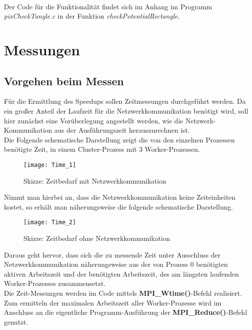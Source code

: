 \documentclass[
10pt, %
a4paper, %
oneside, %
headinclude,footinclude, %
BCOR5mm, %
]{scrartcl}
\begin{document}
\begin{algorithm}[H]
{{		}
	}
\end{algorithm}\

Der Code für die Funktionalität findet sich im Anhang im Programm \textit{pixCheckTangle.c} in der Funktion \textit{checkPotentialRectangle}.


\section{Messungen}
\subsection{Vorgehen beim Messen}

Für die Ermittlung des Speedups sollen Zeitmessungen durchgeführt werden. Da ein großer Anteil der Laufzeit für die Netzwerkkommunikation benötigt wird, soll hier zunächst eine Vorüberlegung angestellt werden, wie die Netzwerk-Kommunikation aus der Ausführungszeit herauszurechnen ist. \\Die Folgende schematische Darstellung zeigt die von den einzelnen Prozessen benötigte Zeit, in einem Cluster-Prozess mit 3 Worker-Prozessen.

\begin{figure}[h]
	\centering 
	\texttt{[image: Time\_1]} 
	\caption[Skizze: Zeitbedarf mit Netzwerkkommunikation]{Skizze: Zeitbedarf mit Netzwerkkommunikation }
	
\end{figure}

Nimmt man hierbei an, dass die Netzwerkkommunikation keine Zeiteinheiten kostet, so erhält man näherungsweise die folgende schematische Darstellung.

\begin{figure}[h]
	\centering 
	\texttt{[image: Time\_2]} 
	\caption[Skizze: Zeitbedarf ohne Netzwerkkommunikation]{Skizze: Zeitbedarf ohne Netzwerkkommunikation}
	
\end{figure}

Daraus geht hervor, dass sich die zu messende Zeit unter Ausschluss der Netzwerkkommunikation näherungsweise aus der von Prozess 0 benötigten aktiven Arbeitszeit und der benötigten Arbeitszeit, des am längsten laufenden Worker-Prozesses zusammensetzt.\\
Die Zeit-Messungen werden im Code mittels \textbf{MPI\_Wtime()}-Befehl realisiert. Zum ermitteln der maximalen Arbeitszeit aller Worker-Prozesse wird im Anschluss an die eigentliche Programm-Ausführung der \textbf{MPI\_Reduce()}-Befehl genutzt. 
\end{document}
